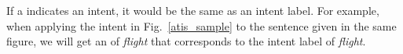 


If a \REtag indicates an intent, it would be the same as an intent label. For example, when applying the intent \RE in
Fig.~\ref{atis_sample} to the sentence given in the same figure, we will get an \REtag of \emph{flight} that corresponds to the intent
label of \emph{flight}.


